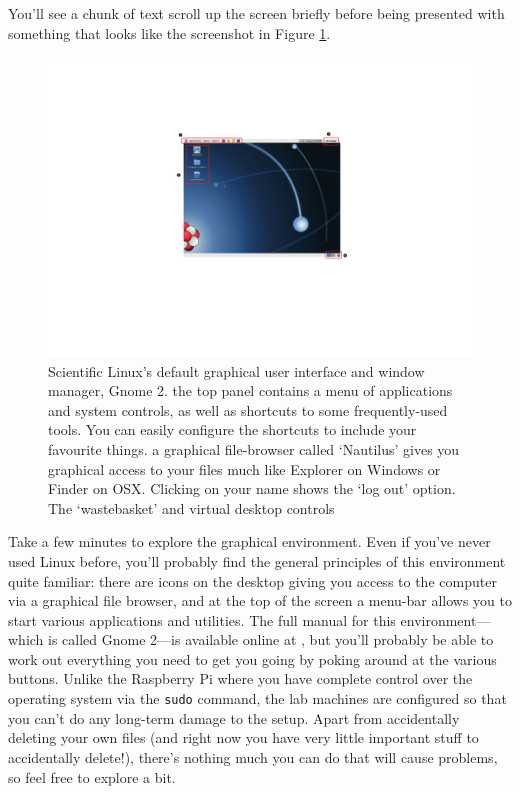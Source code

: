 You'll see a chunk of text scroll up the screen briefly before being presented with something that looks like the screenshot in Figure \ref{figure:gnome-desktop}.

\begin{figure}[t]
\centerline{\includegraphics[width=16cm]{images/gnome-desktop}}
\caption{Scientific Linux's default graphical user interface and
  window manager, Gnome 2. \protect{} the top panel contains
  a menu of applications and system controls, as well as shortcuts to
  some frequently-used tools. You can easily configure the shortcuts
  to include your favourite things. \protect{} a graphical
  file-browser called `Nautilus' gives you graphical access to your
  files much like Explorer on Windows or Finder on
  OSX. \protect{} Clicking on your name shows the `log out'
  option. \protect{} The `wastebasket' and virtual desktop
  controls}\label{figure:gnome-desktop}
\end{figure}

Take a few minutes to explore the graphical environment. Even if you've never used Linux before, you'll probably find the general principles of this environment quite familiar: there are icons on the desktop giving you access to the computer via a graphical file browser, and at the top of the screen a menu-bar allows you to start various applications and utilities. The full manual for this environment---which is called Gnome 2---is available online at , but you'll probably be able to work out everything you need to get you going by poking around at the various buttons. Unlike the Raspberry Pi where you have complete control over the operating system via the \texttt{sudo} command, the lab machines are configured so that you can't do any long-term damage to the setup. Apart from accidentally deleting your own files (and right now you have very little important stuff to accidentally delete!), there's nothing much you can do that will cause problems, so feel free to explore a bit. 

